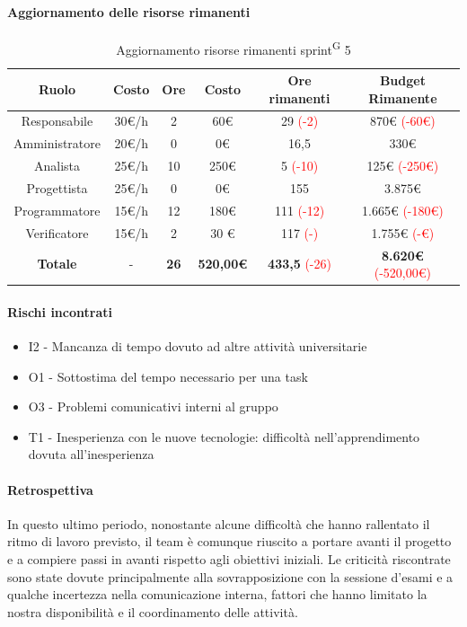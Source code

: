 \documentclass[a4paper, 11pt]{article}
\newcommand{\subsubsubsection}[1]{\paragraph{#1}}
\renewcommand{\arraystretch}{1.4} %
\begin{document}
\subsubsubsection{Aggiornamento delle risorse rimanenti}
\begin{table}[H]
    \centering
    \renewcommand{\arraystretch}{1.5}
    
    \begin{tabular}{|c|c|c|c|c|c|}
        \hline
        \textcolor{AccentColor}{\textbf{Ruolo}} &
        \textcolor{AccentColor}{\textbf{Costo}} &
        \textcolor{AccentColor}{\textbf{Ore}} &
        \textcolor{AccentColor}{\textbf{Costo}} &
        \textcolor{AccentColor}{\textbf{Ore rimanenti}} &
        \textcolor{AccentColor}{\textbf{Budget Rimanente}} \\ \hline
        
        Responsabile & 30€/h & 2 & 60€ & 29 \textcolor{red}{(-2)} & 870€ \textcolor{red}{(-60€)} \\ \hline
        Amministratore & 20€/h & 0 & 0€ & 16,5 & 330€ \\ \hline
        Analista & 25€/h & 10 & 250€ & 5 \textcolor{red}{(-10)} & 125€ \textcolor{red}{(-250€)} \\ \hline
        Progettista & 25€/h & 0 & 0€ & 155 & 3.875€ \\ \hline
        Programmatore & 15€/h & 12 & 180€ & 111 \textcolor{red}{(-12)} & 1.665€ \textcolor{red}{(-180€)} \\ \hline
        Verificatore & 15€/h & 2 & 30 € & 117 \textcolor{red}{(-)} & 1.755€ \textcolor{red}{(-€)} \\ \hline
        \textbf{Totale} & - & \textbf{26} & \textbf{520,00€} & \textbf{433,5} \textcolor{red}{(-26)} & \textbf{8.620€} \textcolor{red}{(-520,00€)} \\ \hline
    \end{tabular}
    \caption{Aggiornamento risorse rimanenti sprint\textsuperscript{G} 5}
\end{table}
\subsubsubsection{Rischi incontrati}
\begin{itemize}
  \item I2 - Mancanza di tempo dovuto ad altre attività universitarie
  \item O1 - Sottostima del tempo necessario per una task
  \item O3 - Problemi comunicativi interni al gruppo
  \item T1 - Inesperienza con le nuove tecnologie: difficoltà nell'apprendimento dovuta all'inesperienza
\end{itemize}
\subsubsubsection{Retrospettiva}
In questo ultimo periodo, nonostante alcune difficoltà che hanno rallentato il ritmo di lavoro previsto, il team è comunque riuscito a portare avanti il progetto e a compiere passi in avanti rispetto agli obiettivi iniziali. Le criticità riscontrate sono state dovute principalmente alla sovrapposizione con la sessione d'esami e a qualche incertezza nella comunicazione interna, fattori che hanno limitato la nostra disponibilità e il coordinamento delle attività.\\
\end{document}
